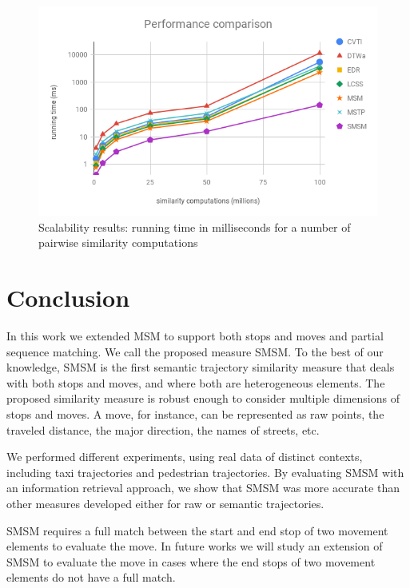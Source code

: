 \documentclass[12pt]{article}
\begin{document}
\begin{figure}[ht!]
\centerline{
\centering
\includegraphics[width=\textwidth]{Images/Performance_comparison.png}
}
\caption{Scalability results: running time in milliseconds for a number of pairwise similarity computations}
\label{fig:performance_comparison}
\end{figure}

\section{Conclusion} \label{sec:conclusions}
In this work we extended MSM to support both stops and moves and partial sequence matching. We call the proposed measure SMSM. To the best of our knowledge, SMSM is the first semantic trajectory similarity measure that deals with both stops and moves, and where both are heterogeneous elements. 
The proposed similarity measure is robust enough to consider multiple dimensions of stops and moves. A move, for instance, can be represented as raw points, the traveled distance, the major direction, the names of streets, etc.

We performed different experiments, using real data of distinct contexts, including taxi trajectories and pedestrian trajectories. By evaluating SMSM with an information retrieval approach, we show that SMSM was more accurate than other measures developed either for raw or semantic trajectories.

SMSM requires a full match between the start and end stop of two movement elements to evaluate the move. In future works we will study an extension of SMSM to evaluate the move in cases where the end stops of two movement elements do not have a full match.



\end{document}
